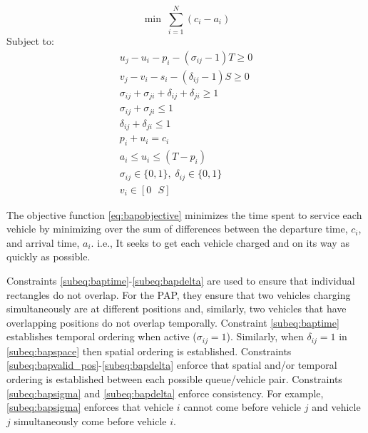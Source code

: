 \begin{equation}
	\label{eq:bapobjective}
	\min\; \sum_{i=1}^N (c_i - a_i)
\end{equation}
Subject to:
\begin{subequations}
\label{eq:bapconstrs}
\begin{align}
    u_j - u_i - p_i - (\sigma_{ij} - 1)T \geq 0                  \label{subeq:baptime}          \\
    v_j - v_i - s_i - (\delta_{ij} - 1)S \geq 0                \label{subeq:bapspace}         \\
    \sigma_{ij} + \sigma_{ji} + \delta_{ij} + \delta_{ji} \geq 1 \label{subeq:bapvalid_pos}     \\
    \sigma_{ij} + \sigma_{ji} \leq 1                              \label{subeq:bapsigma}        \\
    \delta_{ij} + \delta_{ji} \leq 1                              \label{subeq:bapdelta}        \\
    p_i + u_i = c_i                                               \label{subeq:bapdetach}       \\
    a_i \leq u_i \leq (T - p_i)                                   \label{subeq:bapvalid_starts} \\
    \sigma_{ij} \in \{0,1\},\;\delta_{ij} \in \{0,1\}\;           \label{subeq:bapsdspace}      \\
    v_i \in [0 \mbox{ } S ]                                       \label{subeq:bapvspace}
\end{align}
\end{subequations}

\noindent

The objective function \eqref{eq:bapobjective} minimizes the time spent to service each vehicle by minimizing over the
sum of differences between the departure time, $c_i$, and arrival time, $a_i$. i.e., It seeks to get each vehicle
charged and on its way as quickly as possible.

Constraints \ref{subeq:baptime}-\ref{subeq:bapdelta} are used to ensure that individual rectangles do not overlap. For
the PAP, they ensure that two vehicles charging simultaneously are at different positions and, similarly, two vehicles
that have overlapping positions do not overlap temporally. Constraint \eqref{subeq:baptime} establishes temporal
ordering when active ($\sigma_{ij}=1$). Similarly, when $\delta_{ij} =1$ in \eqref{subeq:bapspace} then spatial ordering is
established. Constraints \ref{subeq:bapvalid_pos}-\ref{subeq:bapdelta} enforce that spatial and/or temporal ordering is
established between each possible queue/vehicle pair. Constraints \eqref{subeq:bapsigma} and \eqref{subeq:bapdelta}
enforce consistency. For example, \eqref{subeq:bapsigma} enforces that vehicle $i$ cannot come before vehicle $j$ and
vehicle $j$ simultaneously come before vehicle $i$.

